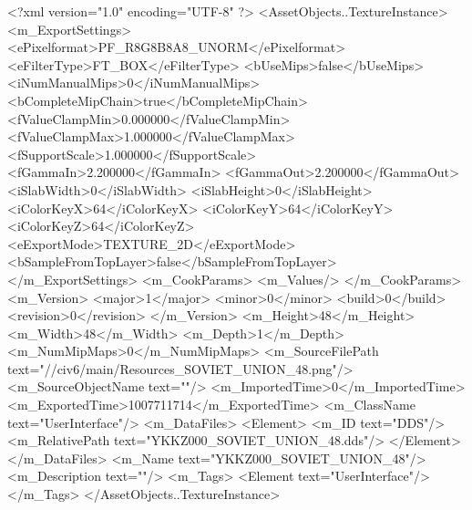 <?xml version="1.0" encoding="UTF-8" ?>
<AssetObjects..TextureInstance>
	<m_ExportSettings>
		<ePixelformat>PF_R8G8B8A8_UNORM</ePixelformat>
		<eFilterType>FT_BOX</eFilterType>
		<bUseMips>false</bUseMips>
		<iNumManualMips>0</iNumManualMips>
		<bCompleteMipChain>true</bCompleteMipChain>
		<fValueClampMin>0.000000</fValueClampMin>
		<fValueClampMax>1.000000</fValueClampMax>
		<fSupportScale>1.000000</fSupportScale>
		<fGammaIn>2.200000</fGammaIn>
		<fGammaOut>2.200000</fGammaOut>
		<iSlabWidth>0</iSlabWidth>
		<iSlabHeight>0</iSlabHeight>
		<iColorKeyX>64</iColorKeyX>
		<iColorKeyY>64</iColorKeyY>
		<iColorKeyZ>64</iColorKeyZ>
		<eExportMode>TEXTURE_2D</eExportMode>
		<bSampleFromTopLayer>false</bSampleFromTopLayer>
	</m_ExportSettings>
	<m_CookParams>
		<m_Values/>
	</m_CookParams>
	<m_Version>
		<major>1</major>
		<minor>0</minor>
		<build>0</build>
		<revision>0</revision>
	</m_Version>
	<m_Height>48</m_Height>
	<m_Width>48</m_Width>
	<m_Depth>1</m_Depth>
	<m_NumMipMaps>0</m_NumMipMaps>
	<m_SourceFilePath text="//civ6/main/Resources_SOVIET_UNION_48.png"/>
	<m_SourceObjectName text=""/>
	<m_ImportedTime>0</m_ImportedTime>
	<m_ExportedTime>1007711714</m_ExportedTime>
	<m_ClassName text="UserInterface"/>
	<m_DataFiles>
		<Element>
			<m_ID text="DDS"/>
			<m_RelativePath text="YKKZ000_SOVIET_UNION_48.dds"/>
		</Element>
	</m_DataFiles>
	<m_Name text="YKKZ000_SOVIET_UNION_48"/>
	<m_Description text=""/>
	<m_Tags>
		<Element text="UserInterface"/>
	</m_Tags>
</AssetObjects..TextureInstance>

